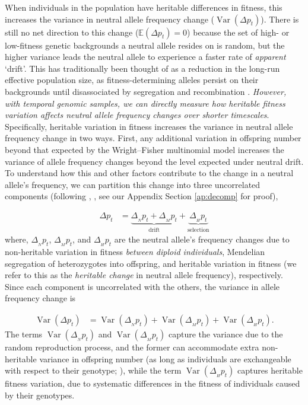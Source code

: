 \documentclass[11pt]{article}
\newcommand{\vb}[1]{{\it \color{blue} #1}}
\newcommand{\E}{\mathbb{E}}
\DeclareMathOperator{\var}{Var}
\begin{document}
When individuals in the population have heritable differences in fitness, this
increases the variance in neutral allele frequency change ($\var(\Delta p_t)$).
There is still no net direction to this change ($\E(\Delta p_t) = 0$) because
the set of high- or low-fitness genetic backgrounds a neutral allele resides on
is random, but the higher variance leads the neutral allele to experience a
faster rate of \emph{apparent} `drift'. This has traditionally been thought of
as a reduction in the long-run effective population size, as
fitness-determining alleles persist on their backgrounds until disassociated by
segregation and recombination \parencite{Robertson1961-ho,
  Santiago1995-hx,Santiago1998-bs}. \vb{However, with temporal genomic samples,
we can directly measure how heritable fitness variation affects neutral allele
frequency changes over shorter timescales}. Specifically, heritable variation
in fitness increases the variance in neutral allele frequency change in two
ways. First, any additional variation in offspring number beyond that expected
by the Wright--Fisher multinomial model increases the variance of allele
frequency changes beyond the level expected under neutral drift. To understand
how this and other factors contribute to the change in a neutral allele's
frequency, we can partition this change into three uncorrelated components
(following \citeauthor{Santiago1995-hx}, \citeyear{Santiago1995-hx}, see our
Appendix Section \ref{ap:decomp} for proof),

\begin{align}
  \Delta p_t %
  &= \underbrace{\Delta_{_N} p_t + \Delta_{_M} p_t}_\text{drift} + \underbrace{\Delta_{_H} p_t}_\text{selection}
  \label{eq:delp-decomp}
\end{align}
%
where, $\Delta_{_N} p_t$, $\Delta_{_M} p_t$, and $\Delta_{_H} p_t$ are the
neutral allele's frequency changes due to non-heritable variation in fitness
\vb{between diploid individuals}, Mendelian segregation of heterozygotes into
offspring, and heritable variation in fitness (we refer to this as the
\emph{heritable change} in neutral allele frequency), respectively. Since each
component is uncorrelated with the others, the variance in allele frequency
change is

\begin{align}
  \var(\Delta p_t) &= \var(\Delta_{_N} p_t)  + \var(\Delta_{_M} p_t) + \var(\Delta_{_H} p_t).
  \label{eq:var-decomp-1}
\end{align}
%
The terms $\var(\Delta_{_N} p_t)$ and $\var(\Delta_{_M} p_t)$ capture the
variance due to the random reproduction process, and the former can
accommodate extra non-heritable variance in offspring number (as long as
individuals are exchangeable with respect to their genotype;
\cite{Cannings1974-ps}), while the term $\var(\Delta_{_H} p_t)$ captures
heritable fitness variation, due to systematic differences in the fitness of
individuals caused by their genotypes.
\end{document}
